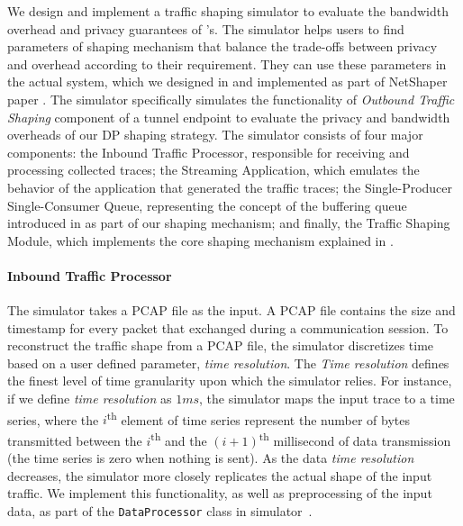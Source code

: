 We design and implement a traffic shaping simulator to evaluate the bandwidth overhead and privacy guarantees of {\sys}'s.
The simulator helps users to find parameters of {\sys} shaping mechanism that balance the trade-offs between privacy and overhead according to their requirement.
They can use these parameters in the actual {\sys} system, which we designed in  and implemented as part of NetShaper paper \cite{netshaper}.
The simulator specifically simulates the functionality of \emph{Outbound Traffic Shaping} component of a tunnel endpoint to evaluate the privacy and bandwidth overheads of our DP shaping strategy.
The simulator consists of four major components: the Inbound Traffic Processor, responsible for receiving and processing collected traces; the Streaming Application, which emulates the behavior of the application that generated the traffic traces; the Single-Producer Single-Consumer Queue, representing the concept of the buffering queue introduced in  as part of our shaping mechanism; and finally, the Traffic Shaping Module, which implements the core shaping mechanism explained in .


\paragraph{Inbound Traffic Processor}\label{subsubsec:design-sim-inbound}
The simulator takes a PCAP file as the input. 
A PCAP file contains the size and timestamp for every packet that exchanged during a communication session.
To reconstruct the traffic shape from a PCAP file, the simulator discretizes time based on a user defined parameter, \emph{time resolution}.
The \emph{Time resolution} defines the finest level of time granularity upon which the simulator relies.
For instance, if we define \emph{time resolution} as $1ms$, the simulator maps the input trace to a time series, where the $i$\textsuperscript{th} element of time series represent the number of bytes transmitted between the $i$\textsuperscript{th} and the $(i+1)$\textsuperscript{th} millisecond of data transmission (the time series is zero when nothing is sent).
As the data \emph{time resolution} decreases, the simulator more closely replicates the actual shape of the input traffic.
We implement this functionality, as well as preprocessing of the input data, as part of the \texttt{DataProcessor} class in simulator~\cite{netshaper_repo}.



